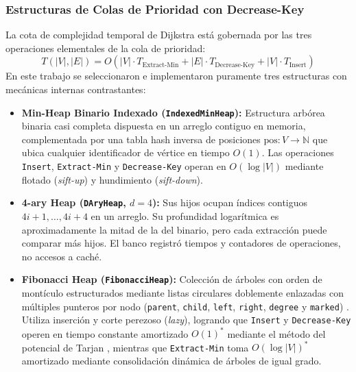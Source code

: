 \subsubsection{Estructuras de Colas de Prioridad con Decrease-Key}
La cota de complejidad temporal de Dijkstra está gobernada por las tres operaciones elementales de la cola de prioridad:
\begin{equation}
    T(|V|, |E|) = O(|V| \cdot T_{\text{Extract-Min}} + |E| \cdot T_{\text{Decrease-Key}} + |V| \cdot T_{\text{Insert}})
\end{equation}
En este trabajo se seleccionaron e implementaron puramente tres estructuras con mecánicas internas contrastantes:
\begin{itemize}
    \item \textbf{Min-Heap Binario Indexado (\texttt{IndexedMinHeap}):} Estructura arbórea binaria casi completa dispuesta en un arreglo contiguo en memoria, complementada por una tabla hash inversa de posiciones $\text{pos}: V \to \mathbb{N}$ que ubica cualquier identificador de vértice en tiempo $O(1)$. Las operaciones \texttt{Insert}, \texttt{Extract-Min} y \texttt{Decrease-Key} operan en $O(\log |V|)$ mediante flotado (\textit{sift-up}) y hundimiento (\textit{sift-down}).
    \item \textbf{4-ary Heap (\texttt{DAryHeap}, $d=4$):} Sus hijos ocupan índices contiguos $4i+1,\ldots,4i+4$ en un arreglo. Su profundidad logarítmica es aproximadamente la mitad de la del binario, pero cada extracción puede comparar más hijos. El banco registró tiempos y contadores de operaciones, no accesos a caché.
    \item \textbf{Fibonacci Heap (\texttt{FibonacciHeap}):} Colección de árboles con orden de montículo estructurados mediante listas circulares doblemente enlazadas con múltiples punteros por nodo (\texttt{parent}, \texttt{child}, \texttt{left}, \texttt{right}, \texttt{degree} y \texttt{marked}) \parencite{fredman1987fibonacci}. Utiliza inserción y corte perezoso (\textit{lazy}), logrando que \texttt{Insert} y \texttt{Decrease-Key} operen en tiempo constante amortizado $O(1)^*$ mediante el método del potencial de Tarjan \parencite{tarjan1983data}, mientras que \texttt{Extract-Min} toma $O(\log |V|)^*$ amortizado mediante consolidación dinámica de árboles de igual grado.
\end{itemize}

